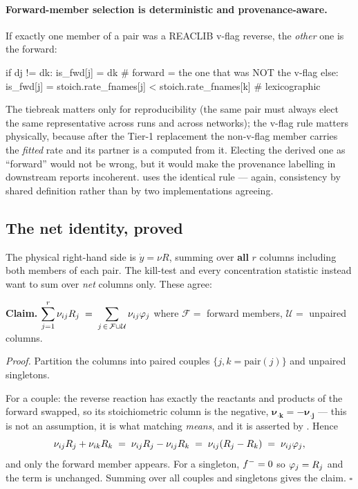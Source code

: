 \paragraph{Forward-member selection is deterministic and provenance-aware.} If
exactly one member of a pair was a REACLIB v-flag reverse, the \emph{other} one
is the forward:

\begin{srclisting}
if dj != dk:
    is_fwd[j] = dk                    # forward = the one that was NOT the v-flag
else:
    is_fwd[j] = stoich.rate_fnames[j] < stoich.rate_fnames[k]  # lexicographic
\end{srclisting}

The tiebreak matters only for reproducibility (the same pair must always elect
the same representative across runs and across networks); the v-flag rule
matters physically, because after the Tier-1 replacement the non-v-flag member
carries the \emph{fitted} rate and its partner is a  computed
from it. Electing the derived one as ``forward'' would not be wrong, but it
would make the provenance labelling in downstream reports incoherent.
 uses the identical rule --- again,
consistency by shared definition rather than by two implementations agreeing.

\subsection{The net identity, proved}
\label{sec:netidentity}

The physical right-hand side is $\dot y = \nu R$, summing over \textbf{all} $r$
columns including both members of each pair. The kill-test and every
concentration statistic instead want to sum over \emph{net} columns only. These
agree:

\begin{invariant}
\textbf{Claim.} $\displaystyle \sum_{j=1}^{r}\nu_{ij}R_j \;=\;
\sum_{j\,\in\,\mathcal{F}\cup\mathcal{U}}\nu_{ij}\varphi_j$
where $\mathcal{F} =$ forward members, $\mathcal{U} =$ unpaired columns.
\end{invariant}

\emph{Proof.} Partition the columns into paired couples
$\{j, k = \mathrm{pair}(j)\}$ and unpaired singletons.

For a couple: the reverse reaction has exactly the reactants and products of the
forward swapped, so its stoichiometric column is the negative,
$\boldsymbol{\nu_{\cdot k} = -\nu_{\cdot j}}$ --- this is not an assumption, it
is what  matching \emph{means}, and it is asserted by
. Hence
%
\begin{equation}
\nu_{ij}R_j + \nu_{ik}R_k \;=\; \nu_{ij}R_j - \nu_{ij}R_k
\;=\; \nu_{ij}(R_j - R_k) \;=\; \nu_{ij}\varphi_j,
\label{eq:coupleterm}
\end{equation}
%
and only the forward member appears. For a singleton, $f^{-} = 0$ so
$\varphi_j = R_j$ and the term is unchanged. Summing over all couples and
singletons gives the claim. $\square$


